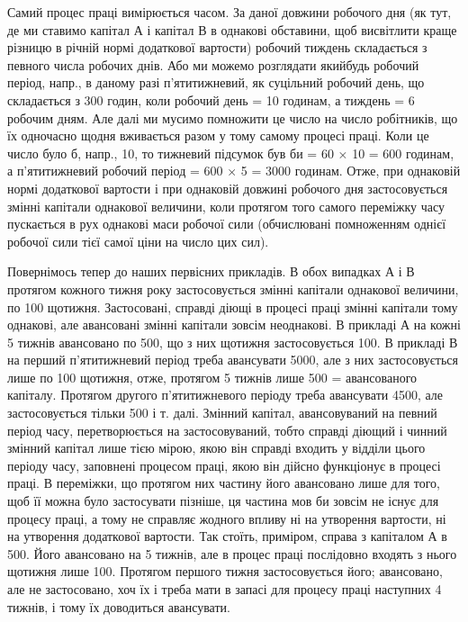 Самий процес праці вимірюється часом. За даної довжини робочого
дня (як тут, де ми ставимо капітал А і капітал В в однакові обставини,
щоб висвітлити краще різницю в річній нормі додаткової вартости)
робочий тиждень складається з певного числа робочих днів. Або ми
можемо розглядати якийбудь робочий період, напр., в даному разі п’ятитижневий,
як суцільний робочий день, що складається з 300 годин, коли
робочий день = 10 годинам, а тиждень = 6 робочим дням. Але далі ми
мусимо помножити це число на число робітників, що їх одночасно щодня
вживається разом у тому самому процесі праці. Коли це число
було б, напр., 10, то тижневий підсумок був би = 60 × 10 = 600 годинам,
а п’ятитижневий робочий період = 600 × 5 = 3000 годинам. Отже,
при однаковій нормі додаткової вартости і при однаковій довжині робочого
дня застосовується змінні капітали однакової величини, коли протягом
того самого переміжку часу пускається в рух однакові маси робочої
сили (обчислювані помноженням однієї робочої сили тієї самої
ціни на число цих сил).

Повернімось тепер до наших первісних прикладів. В обох випадках
А і В протягом кожного тижня року застосовується змінні капітали
однакової величини, по 100 щотижня. Застосовані, справді діющі
в процесі праці змінні капітали тому однакові, але авансовані змінні
капітали зовсім неоднакові. В прикладі А на кожні 5 тижнів авансовано по
500, що з них щотижня застосовується 100. В прикладі
В на перший п’ятитижневий період треба авансувати 5000, але
з них застосовується лише по 100 щотижня, отже, протягом
5 тижнів лише 500 =  авансованого капіталу. Протягом
другого п’ятитижневого періоду треба авансувати 4500, але застосовується
тільки 500 і т. далі. Змінний капітал, авансовуваний
на певний період часу, перетворюється на застосовуваний, тобто справді
діющий і чинний змінний капітал лише тією мірою, якою він справді входить
у відділи цього періоду часу, заповнені процесом праці, якою він
дійсно функціонує в процесі праці. В переміжки, що протягом них
частину його авансовано лише для того, щоб її можна було застосувати
пізніше, ця частина мов би зовсім не існує для процесу праці, а тому
не справляє жодного впливу ні на утворення вартости, ні на утворення
додаткової вартости. Так стоїть, приміром, справа з капіталом А в
500. Його авансовано на 5 тижнів, але в процес праці послідовно
входять з нього щотижня лише 100. Протягом першого тижня
застосовується  його;  авансовано, але не застосовано, хоч їх і
треба мати в запасі для процесу праці наступних 4 тижнів, і тому їх
доводиться авансувати.

